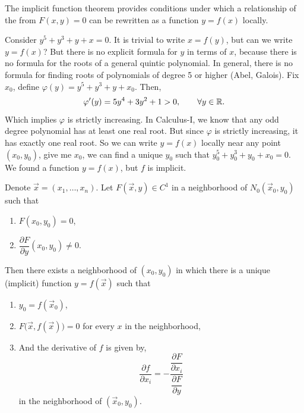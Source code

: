The implicit function theorem provides conditions under which a relationship of the from $F(x,y)=0$ can be rewritten as
a function $y=f(x)$ locally. 
\begin{example}
    Consider $y^5+y^3+y+x=0$. It is trivial to write $x=f(y)$, but can we write $y=f(x)$?
    But there is no explicit formula for $y$ in terms of $x$, because there is no formula for the roots of a general quintic polynomial.
    In general, there is no formula for finding roots of polynomials of degree 5 or higher (Abel, Galois). 
    Fix $x_0$, define $\varphi(y)=y^5+y^3+y+x_0$. Then,
\[
\varphi'(y)=5y^4+3y^2+1>0,\qquad\forall y\in\mathbb{R}.
\] 
Which implies $\varphi$ is strictly increasing. In Calculus-I, we know that any odd degree polynomial has at least one real root.
But since $\varphi$ is strictly increasing, it has exactly one real root. So we can write $y=f(x)$ locally near any point $(x_0,y_0)$, give me 
$x_0$, we can find a unique $y_0$ such that $y_0^5+y_0^3+y_0+x_0=0$. We found a function $y=f(x)$, but $f$ is implicit.       
\end{example} 
\begin{theorem}
Denote $\vec x=(x_1,\ldots,x_n)$. Let $F(\vec x,y)\in C^1$ in a neighborhood of $N_0(\vec x_0,y_0)$ such that
\begin{enumerate}
    \item $F(x_0,y_0)=0$,
    \item $\dfrac{\partial F}{\partial y}(x_0,y_0)\neq 0$.
\end{enumerate}
Then there exists a neighborhood of \((x_0,y_0)\) in which there is a unique (implicit) function
$y=f(\vec x)$ such that
\begin{enumerate}
    \item[(i)] \(y_0=f(\vec x_0)\),
    \item[(ii)] \(F\bigl(\vec x,f(\vec x)\bigr)=0\) for every \(x\) in the neighborhood,
    \item[(iii)] And the derivative of \(f\) is given by,
    \[
    \frac{\partial f}{\partial x_i}=-\frac{\dfrac{\partial F}{\partial x_i}}{\dfrac{\partial F}{\partial y}}
    \]
    in the neighborhood of $(\vec x_0,y_0)$.
\end{enumerate}
\end{theorem} 
